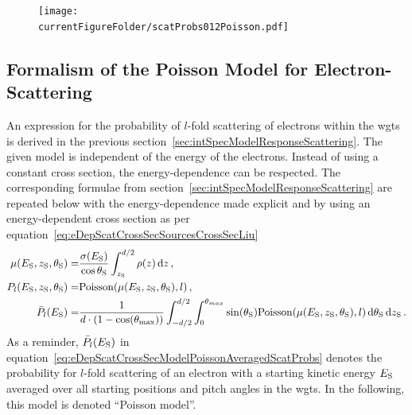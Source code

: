 \begin{figure}[th]
\texttt{[image: \\currentFigureFolder/scatProbs012Poisson.pdf]}
        \label{fig:eDepScatCrossSecModel}
\end{figure}

\subsection{Formalism of the Poisson Model for Electron-Scattering}
An expression for the probability of $l$-fold scattering of electrons within the \gls{wgts} is derived in the previous section~\ref{sec:intSpecModelResponseScattering}. The given model is independent of the energy of the electrons. Instead of using a constant cross section, the energy-dependence can be respected. The corresponding formulae from section~\ref{sec:intSpecModelResponseScattering} are repeated below with the energy-dependence made explicit and by using an energy-dependent cross section as per equation~\eqref{eq:eDepScatCrossSecSourcesCrossSecLiu}
\begin{subequations}
\label{eq:eDepScatCrossSecModelPoisson}
\begin{align}
    \mu(E_\mathrm{S},z_\mathrm{S},\theta_\mathrm{S}) =&
    \frac{\sigma(E_\mathrm{S})}{\cos\theta_\mathrm{S}}
    \int_{z_\mathrm{S}}^{d/2} \rho(z)\mathop{}\!\mathrm{d} z \label{eq:energydepScatProbsPoissonExpectedScatCount} 
    \text{\,,}\\
    P_l(E_\mathrm{S},z_\mathrm{S},\theta_\mathrm{S}) =&
    \mathrm{Poisson}(\mu(E_\mathrm{S},z_\mathrm{S},\theta_\mathrm{S}),l) \label{eq:eDepScatCrossSecModelPoissonNonAveragedScatProbs} 
    \text{\,,} \\
    \bar{P}_l(E_\mathrm{S}) =&
    \frac{1}{d \cdot (1-\cos(\theta_\mathrm{max}))} 
      \int_{-d/2}^{d/2}  
          \int_{0}^{\theta_{max}} 
            \sin(\theta_\mathrm{S})
            \mathrm{Poisson}(\mu(E_\mathrm{S},z_\mathrm{S},\theta_\mathrm{S}),l)
          \mathop{}\!\mathrm{d}\theta_\mathrm{S}
      \mathop{}\!\mathrm{d}z_\mathrm{S}
      \label{eq:eDepScatCrossSecModelPoissonAveragedScatProbs}
    \text{\,.}
\end{align}
\end{subequations}
As a reminder, $\bar{P}_l(E_\mathrm{S})$ in equation~\eqref{eq:eDepScatCrossSecModelPoissonAveragedScatProbs} denotes the probability for $l$-fold scattering of an electron with a starting kinetic energy $E_\mathrm{S}$ averaged over all starting positions and pitch angles in the \gls{wgts}. In the following, this model is denoted ``Poisson model''. 

